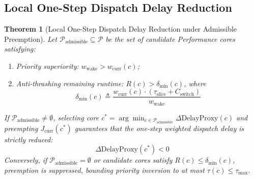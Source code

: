 \documentclass[conference]{IEEEtran}
\newtheorem{theorem}{Theorem}
\begin{document}
\subsection{Local One-Step Dispatch Delay Reduction}

\begin{theorem}[Local One-Step Dispatch Delay Reduction under Admissible Preemption]
\label{thm:oapf_optimality}
Let $\mathcal{P}_{\mathrm{admissible}} \subseteq \mathcal{P}$ be the set of candidate Performance cores satisfying:
\begin{enumerate}
    \item Priority superiority: $w_{\mathrm{wake}} > w_{\mathrm{curr}}(c)$;
    \item Anti-thrashing remaining runtime: $R(c) > \delta_{\min}(c)$, where
    \begin{equation}
    \delta_{\min}(c) \triangleq \frac{w_{\mathrm{curr}}(c) \cdot (\tau_{\mathrm{slice}} + C_{\mathrm{switch}})}{w_{\mathrm{wake}}}
    \end{equation}
\end{enumerate}
If $\mathcal{P}_{\mathrm{admissible}} \ne \emptyset$, selecting core $c^* = \arg\min_{c \in \mathcal{P}_{\mathrm{admissible}}} \Delta\mathrm{DelayProxy}(c)$ and preempting $J_{\mathrm{curr}}(c^*)$ guarantees that the one-step weighted dispatch delay is strictly reduced:
\begin{equation}
\Delta\mathrm{DelayProxy}(c^*) < 0
\end{equation}
Conversely, if $\mathcal{P}_{\mathrm{admissible}} = \emptyset$ or candidate cores satisfy $R(c) \le \delta_{\min}(c)$, preemption is suppressed, bounding priority inversion to at most $\tau(c) \le \tau_{\max}$.
\end{theorem}
\end{document}
